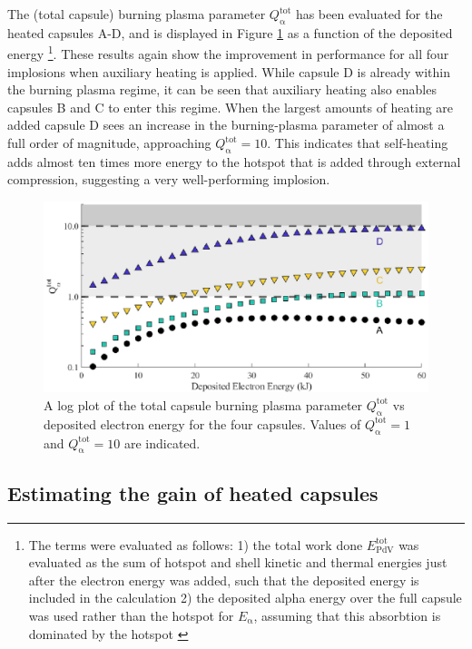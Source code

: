 The (total capsule) burning plasma parameter $Q^\mathrm{{tot}}_{\mathrm{\alpha}}$ has been evaluated for the heated capsules A-D, and is displayed in Figure \ref{fig:HeatedQ}
as a function of the deposited energy \footnote{The terms were evaluated as follows: 1) the total work done $E^\mathrm{{tot}}_{\mathrm{PdV}}$ was evaluated as the sum of hotspot and shell kinetic and thermal energies just after the electron energy was added, such that the deposited energy is included in the calculation 2) the deposited alpha energy over the full capsule was used rather than the hotspot for $E_\mathrm{\alpha}$, assuming that this absorbtion is dominated by the hotspot \cite{Christopherson2018}}. These results again show the improvement in performance for all four implosions when auxiliary heating is applied. While capsule D is already within the burning plasma regime, it can be seen that auxiliary heating also enables capsules B and C to enter this regime. When the largest amounts of heating are added capsule D sees an increase in the burning-plasma parameter of almost a full order of magnitude, approaching $Q^\mathrm{{tot}}_{\mathrm{\alpha}} = 10$. This indicates that self-heating adds almost ten times more energy to the hotspot that is added through external compression, suggesting a very well-performing implosion.

\begin{figure}[ht]
\centering
\includegraphics{figures/FurtherSims/QHeatingPlot.eps}
\caption{A log plot of the total capsule burning plasma parameter $Q^\mathrm{{tot}}_{\mathrm{\alpha}}$ vs deposited electron energy for the four capsules. Values of $Q^\mathrm{{tot}}_{\mathrm{\alpha}} = 1$ and $Q^\mathrm{{tot}}_{\mathrm{\alpha}} = 10$ are indicated.}
\label{fig:HeatedQ}
\end{figure}

\subsection{Estimating the gain of heated capsules}

